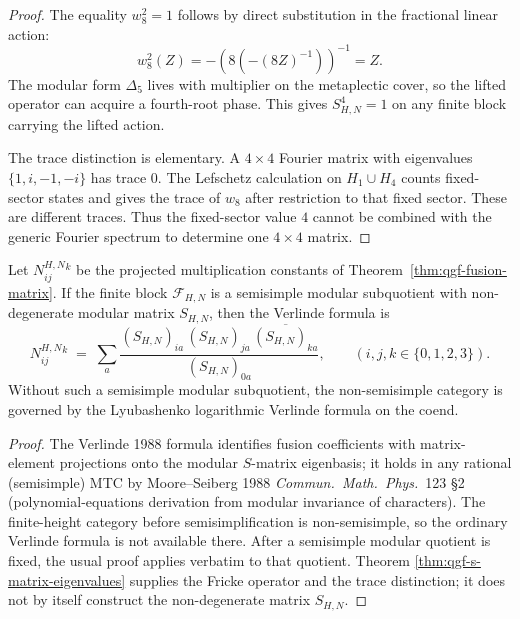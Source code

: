 \begin{proof}
The equality \(w_8^2=1\) follows by direct substitution in the
fractional linear action:
\[
 w_8^2(Z)=-(8(-(8Z)^{-1}))^{-1}=Z.
\]
The modular form \(\Delta_5\) lives with multiplier on the metaplectic
cover, so the lifted operator can acquire a fourth-root phase. This
gives \(S_{H,N}^4=1\) on any finite block carrying the lifted action.

The trace distinction is elementary. A \(4\times4\) Fourier matrix with
eigenvalues \(\{1,i,-1,-i\}\) has trace \(0\). The Lefschetz
calculation on \(H_1\cup H_4\) counts fixed-sector states and gives
the trace of \(w_8\) after restriction to that fixed sector. These are
different traces. Thus the fixed-sector value \(4\) cannot be combined
with the generic Fourier spectrum to determine one \(4\times4\) matrix.
\end{proof}

\begin{theorem}
\label{thm:qgf-verlinde-agreement}
Let \(N^{H,N}_{ij}{}^k\) be the projected multiplication constants of
Theorem~\ref{thm:qgf-fusion-matrix}. If the finite block
\(\mathcal F_{H,N}\) is a semisimple modular subquotient with
non-degenerate modular matrix \(S_{H,N}\), then the Verlinde formula is
\[
 N^{H,N}_{ij}{}^k
 \;=\;
 \sum_a
 \frac{(S_{H,N})_{ia}\,(S_{H,N})_{ja}\,
 \overline{(S_{H,N})_{ka}}}{(S_{H,N})_{0a}},
 \qquad (i, j, k \in \{0, 1, 2, 3\}).
\]
Without such a semisimple modular subquotient, the non-semisimple
category is governed by the Lyubashenko logarithmic Verlinde formula on
the coend.
\end{theorem}

\begin{proof}
The Verlinde 1988 formula identifies fusion coefficients with
matrix-element projections onto the modular $S$-matrix eigenbasis;
it holds in any rational (semisimple) MTC by Moore--Seiberg 1988
\emph{Commun.\ Math.\ Phys.}~123 \S2 (polynomial-equations derivation
from modular invariance of characters). The finite-height category
before semisimplification is non-semisimple, so the ordinary Verlinde
formula is not available there. After a semisimple modular quotient is
fixed, the usual proof applies verbatim to that quotient. Theorem
\ref{thm:qgf-s-matrix-eigenvalues} supplies the Fricke operator and the
trace distinction; it does not by itself construct the non-degenerate
matrix \(S_{H,N}\).
\end{proof}

